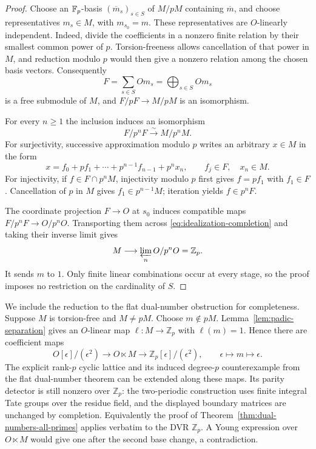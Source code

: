 \begin{proof}
Choose an $\mathbb F_p$-basis $(\overline m_s)_{s\in S}$ of $M/pM$
containing $\overline m$, and choose representatives $m_s\in M$, with
$m_{s_0}=m$.  These representatives are $O$-linearly independent.
Indeed, divide the coefficients in a nonzero finite relation by their
smallest common power of $p$.  Torsion-freeness allows cancellation of
that power in $M$, and reduction modulo $p$ would then give a nonzero
relation among the chosen basis vectors.  Consequently
\[
 F=\sum_{s\in S}O m_s=\bigoplus_{s\in S}O m_s
\]
is a free submodule of $M$, and $F/pF\to M/pM$ is an isomorphism.

For every $n\geq1$ the inclusion induces an isomorphism
\begin{equation}\label{eq:idealization-completion}
 F/p^nF\xrightarrow{\ \sim\ }M/p^nM.
\end{equation}
For surjectivity, successive approximation modulo $p$ writes an arbitrary
$x\in M$ in the form
\[
 x=f_0+pf_1+\cdots+p^{n-1}f_{n-1}+p^n x_n,
 \qquad f_j\in F,\quad x_n\in M.
\]
For injectivity, if $f\in F\cap p^nM$, injectivity modulo $p$ first
gives $f=pf_1$ with $f_1\in F$.  Cancellation of $p$ in $M$ gives
$f_1\in p^{n-1}M$; iteration yields $f\in p^nF$.

The coordinate projection $F\to O$ at $s_0$ induces compatible maps
$F/p^nF\to O/p^nO$.  Transporting them across
\eqref{eq:idealization-completion} and taking their inverse limit gives
\[
 M\longrightarrow\varprojlim_n O/p^nO=\mathbb Z_p.
\]
It sends $m$ to $1$.  Only finite linear combinations occur at every
stage, so the proof imposes no restriction on the cardinality of $S$.
\end{proof}


We include the reduction to the flat dual-number obstruction for
completeness.  Suppose $M$ is torsion-free and $M\ne pM$.  Choose $m\notin pM$.  Lemma~\ref{lem:padic-separation} gives
an $O$-linear map $\ell:M\to\mathbb Z_p$ with $\ell(m)=1$.
Hence there are coefficient maps
\[
 O[\epsilon]/(\epsilon^2)\longrightarrow O\ltimes M
 \longrightarrow\mathbb Z_p[\epsilon]/(\epsilon^2),
 \qquad \epsilon\longmapsto m\longmapsto\epsilon.
\]
The explicit rank-$p$ cyclic lattice and its induced degree-$p$
counterexample from the flat dual-number theorem can be extended
along these maps.  Its parity detector is still nonzero over
$\mathbb Z_p$: the two-periodic construction uses finite integral
Tate groups over the residue field, and the displayed boundary
matrices are unchanged by completion.  Equivalently the proof of
Theorem~\ref{thm:dual-numbers-all-primes} applies verbatim to the
DVR $\mathbb Z_p$.  A Young expression over $O\ltimes M$ would
give one after the second base change, a contradiction.

